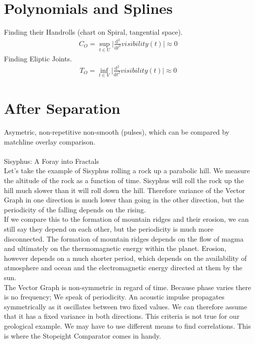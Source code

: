 \documentclass{report}
\begin{document}
\chapter{Polynomials and Splines}
Finding their Handrolls (chart on Spiral, tangential space).
\begin{align}
C_{O}=\sup_{t \in U} \lvert \frac{\mathrm{d}^2}{\mathrm{d}t^2}visibility(t) \rvert \approx 0
\end{align}
Finding Eliptic Joints.\\
\begin{align}
T_{O}=\inf_{t \in V} \lvert \frac{\mathrm{d}^2}{\mathrm{d}t^2}visibility(t) \rvert \approx 0
\end{align}

\chapter{After Separation}
Asymetric, non-repetitive non-smooth (pulses), which can be compared by matchline overlay comparison.\\\\
Sisyphus: A Foray into Fractals\\
Let's take the example of Sisyphus rolling a rock up a parabolic hill. We measure the altitude of the rock as a function of time. Sisyphus will roll the rock up the hill much slower than it will roll down the hill. Therefore variance of the Vector Graph in one direction is much lower than going in the other direction, but the periodicity of the falling depends on the rising.\\
If we compare this to the formation of mountain ridges and their erosion, we can still say they depend on each other, but the periodicity is much more disconnected. The formation of mountain ridges depends on the flow of magma and ultimately on the thermomagnetic energy within the planet. Erosion, however depends on a much shorter period, which depends on the availability of atmosphere and ocean and the electromagnetic energy directed at them by the sun.\\
The Vector Graph is non-symmetric in regard of time. Because phase varies there is no frequency; We speak of periodicity. An acoustic impulse propagates symmetrically as it oscillates between two fixed values. We can therefore assume that it has a fixed variance in both directions. This criteria is not true for our geological example. We may have to use different means to find correlations. This is where the Stopeight Comparator comes in handy.\\


\iffalse
\printbibliography
\fi
{}

\end{document}
